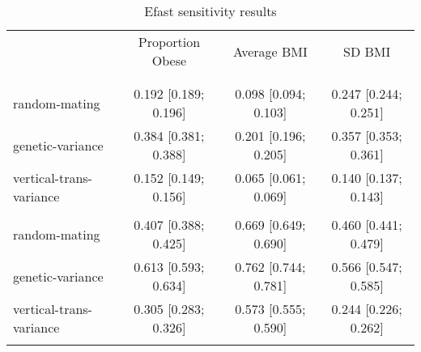 
\begin{table}[htp]
\caption{Efast sensitivity results}
\label{tab:sensitivity}
\footnotesize
\centering
\begin{tabular}{lccc}
\hline
\addlinespace
& Proportion Obese & Average BMI & SD BMI \\
\addlinespace
\hline
\addlinespace
\multicolumn{4}{l}{\textbf{Scenario 3}} \\
\addlinespace[6pt]
\multicolumn{4}{l}{\hspace{1em} S1} \\
\hspace{1.5em} random-mating & 0.192 [0.189; 0.196] & 0.098 [0.094; 0.103] & 0.247 [0.244; 0.251]\\ 
	\hspace{1.5em} genetic-variance & 0.384 [0.381; 0.388] & 0.201 [0.196; 0.205] & 0.357 [0.353; 0.361]\\ 
	\hspace{1.5em} vertical-trans-variance & 0.152 [0.149; 0.156] & 0.065 [0.061; 0.069] & 0.140 [0.137; 0.143]\\
\addlinespace[12pt]
\multicolumn{4}{l}{\hspace{1em} ST} \\ 
\hspace{1.5em} random-mating & 0.407 [0.388; 0.425] & 0.669 [0.649; 0.690] & 0.460 [0.441; 0.479]\\ 
	\hspace{1.5em} genetic-variance & 0.613 [0.593; 0.634] & 0.762 [0.744; 0.781] & 0.566 [0.547; 0.585]\\ 
	\hspace{1.5em} vertical-trans-variance & 0.305 [0.283; 0.326] & 0.573 [0.555; 0.590] & 0.244 [0.226; 0.262]\\ 
\addlinespace
\hline
\end{tabular}
\end{table}